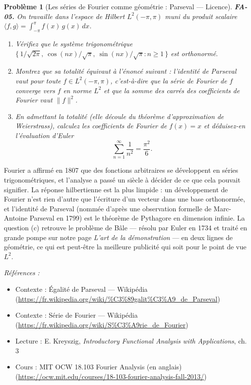 \documentclass[11pt]{article}
\newtheorem{problem}{Problème}
\newenvironment{refs}{\par\small\noindent\emph{Références :}\begin{itemize}\setlength\itemsep{0pt}}{\end{itemize}\normalsize}
\begin{document}
\bigskip

\begin{problem}[{Les séries de Fourier comme géométrie : Parseval --- Licence}]
\textbf{FA-05.} On travaille dans l'espace de Hilbert $ L^2(-\pi, \pi) $ muni du produit
scalaire $ \langle f, g\rangle = \int_{-\pi}^{\pi} f(x)\,g(x)\,dx $.
\begin{enumerate}
\item[(a)] Vérifiez que le système trigonométrique
$ \big\{\, 1/\sqrt{2\pi},\ \cos(nx)/\sqrt{\pi},\ \sin(nx)/\sqrt{\pi} : n \ge 1 \,\big\} $
est orthonormé.
\item[(b)] Montrez que sa totalité équivaut à l'énoncé suivant : l'identité de Parseval vaut pour toute
$ f \in L^2(-\pi,\pi) $, c'est-à-dire que la série de Fourier de $ f $ converge vers $ f $
en norme $ L^2 $ et que la somme des carrés des coefficients de Fourier vaut $ \|f\|^2 $.
\item[(c)] En admettant la totalité (elle découle du théorème d'approximation de Weierstrass), calculez les
coefficients de Fourier de $ f(x) = x $ et déduisez-en l'évaluation d'Euler
\[ \sum_{n=1}^{\infty} \frac{1}{n^2} = \frac{\pi^2}{6} . \]
\end{enumerate}

\end{problem}

\noindent Fourier a affirmé en 1807 que des fonctions arbitraires se développent en séries
trigonométriques, et l'analyse a passé un siècle à décider de ce que cela pouvait signifier. La réponse
hilbertienne est la plus limpide : un développement de Fourier n'est rien d'autre que l'écriture d'un
vecteur dans une base orthonormée, et l'identité de Parseval (nommée d'après une observation formelle
de Marc-Antoine Parseval en 1799) est le théorème de Pythagore en dimension infinie. La question (c)
retrouve le problème de Bâle --- résolu par Euler en 1734 et traité en grande pompe sur notre page
\textit{L'art de la démonstration} --- en deux lignes de géométrie, ce qui est peut-être la meilleure
publicité qui soit pour le point de vue $ L^2 $.

\begin{refs}
\item Contexte : Égalité de Parseval --- Wikipédia (\url{https://fr.wikipedia.org/wiki/%C3%89galit%C3%A9_de_Parseval})
\item Contexte : Série de Fourier --- Wikipédia (\url{https://fr.wikipedia.org/wiki/S%C3%A9rie_de_Fourier})
\item Lecture : E. Kreyszig, \textit{Introductory Functional Analysis with Applications}, ch. 3
\item Cours : MIT OCW 18.103 Fourier Analysis (en anglais) (\url{https://ocw.mit.edu/courses/18-103-fourier-analysis-fall-2013/})
\end{refs}
\end{document}
